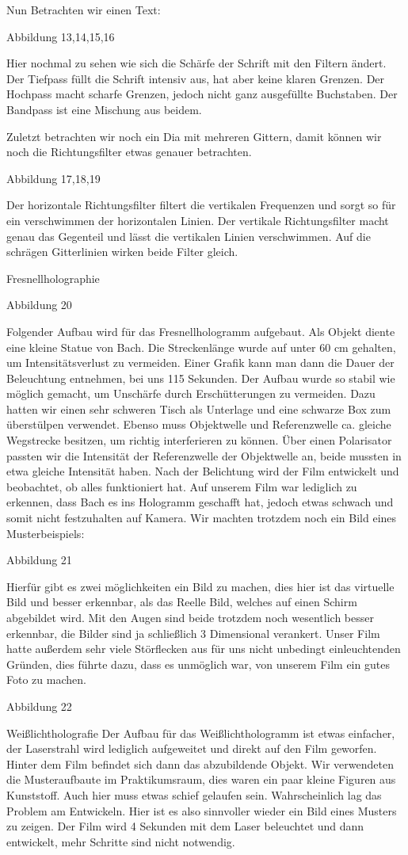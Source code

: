 Nun Betrachten wir einen Text:

Abbildung 13,14,15,16

Hier nochmal zu sehen wie sich die Schärfe der Schrift mit den Filtern ändert. Der Tiefpass füllt die Schrift intensiv aus, hat aber keine klaren Grenzen. Der Hochpass macht scharfe Grenzen, jedoch nicht ganz ausgefüllte Buchstaben. Der Bandpass ist eine Mischung aus beidem.

Zuletzt betrachten wir noch ein Dia mit mehreren Gittern, damit können wir noch die Richtungsfilter etwas genauer betrachten.

Abbildung 17,18,19

Der horizontale Richtungsfilter filtert die vertikalen Frequenzen und sorgt so für ein verschwimmen der horizontalen Linien. Der vertikale Richtungsfilter macht genau das Gegenteil und lässt die vertikalen Linien verschwimmen. Auf die schrägen Gitterlinien wirken beide Filter gleich.

Fresnellholographie

Abbildung 20

Folgender Aufbau wird für das Fresnellhologramm aufgebaut. Als Objekt diente eine kleine Statue von Bach. Die Streckenlänge wurde auf unter 60 cm gehalten, um Intensitätsverlust zu vermeiden. Einer Grafik kann man dann die Dauer der Beleuchtung entnehmen, bei uns 115 Sekunden. Der Aufbau wurde so stabil wie möglich gemacht, um Unschärfe durch Erschütterungen zu vermeiden. Dazu hatten wir einen sehr schweren Tisch als Unterlage und eine schwarze Box zum überstülpen verwendet. Ebenso muss Objektwelle und Referenzwelle ca. gleiche Wegstrecke besitzen, um richtig interferieren zu können. Über einen Polarisator passten wir die Intensität der Referenzwelle der Objektwelle an, beide mussten in etwa gleiche Intensität haben.
Nach der Belichtung wird der Film entwickelt und beobachtet, ob alles funktioniert hat. Auf unserem Film war lediglich zu erkennen, dass Bach es ins Hologramm geschafft hat, jedoch etwas schwach und somit nicht festzuhalten auf Kamera. Wir machten trotzdem noch ein Bild eines Musterbeispiels:

Abbildung 21

Hierfür gibt es zwei möglichkeiten ein Bild zu machen, dies hier ist das virtuelle Bild und besser erkennbar, als das Reelle Bild, welches auf einen Schirm abgebildet wird. Mit den Augen sind beide trotzdem noch wesentlich besser erkennbar, die Bilder sind ja schließlich 3 Dimensional verankert.
Unser Film hatte außerdem sehr viele Störflecken aus für uns nicht unbedingt einleuchtenden Gründen, dies führte dazu, dass es unmöglich war, von unserem Film ein gutes Foto zu machen.

Abbildung 22

Weißlichtholografie
Der Aufbau für das Weißlichthologramm ist etwas einfacher, der Laserstrahl wird lediglich aufgeweitet und direkt auf den Film geworfen. Hinter dem Film befindet sich dann das abzubildende Objekt. Wir verwendeten die Musteraufbaute im Praktikumsraum, dies waren ein paar kleine Figuren aus Kunststoff. Auch hier muss etwas schief gelaufen sein. Wahrscheinlich lag das Problem am Entwickeln. Hier ist es also sinnvoller wieder ein Bild eines Musters zu zeigen. Der Film wird 4 Sekunden mit dem Laser beleuchtet und dann entwickelt, mehr Schritte sind nicht notwendig. 
